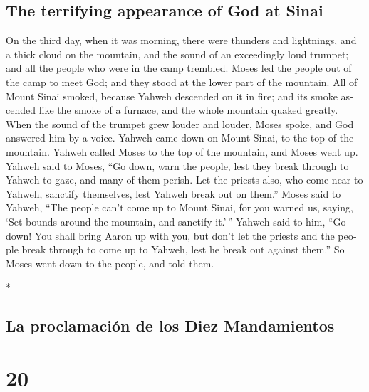 \begin{paracol}{2}
\begin{otherlanguage}{english}
\hypertarget{the-terrifying-appearance-of-god-at-sinai}{%
\subsection{The terrifying appearance of God at
Sinai}\label{the-terrifying-appearance-of-god-at-sinai}}

 On the third day, when it was morning, there were
thunders and lightnings, and a thick cloud on the mountain, and the
sound of an exceedingly loud trumpet; and all the people who were in the
camp trembled.  Moses led the people out of the camp to
meet God; and they stood at the lower part of the mountain.
 All of Mount Sinai smoked, because Yahweh descended on
it in fire; and its smoke ascended like the smoke of a furnace, and the
whole mountain quaked greatly.  When the sound of the
trumpet grew louder and louder, Moses spoke, and God answered him by a
voice.  Yahweh came down on Mount Sinai, to the top of
the mountain. Yahweh called Moses to the top of the mountain, and Moses
went up.  Yahweh said to Moses, ``Go down, warn the
people, lest they break through to Yahweh to gaze, and many of them
perish.  Let the priests also, who come near to Yahweh,
sanctify themselves, lest Yahweh break out on them.'' 
Moses said to Yahweh, ``The people can't come up to Mount Sinai, for you
warned us, saying, `Set bounds around the mountain, and sanctify
it.'\,''  Yahweh said to him, ``Go down! You shall bring
Aaron up with you, but don't let the priests and the people break
through to come up to Yahweh, lest he break out against them.''
 So Moses went down to the people, and told them.

\end{otherlanguage}

\switchcolumn[0]*

\hypertarget{la-proclamaciuxf3n-de-los-diez-mandamientos}{%
\subsection{La proclamación de los Diez
Mandamientos}\label{la-proclamaciuxf3n-de-los-diez-mandamientos}}

\hypertarget{section-38}{%
\section{20}\label{section-38}}


\end{paracol}
